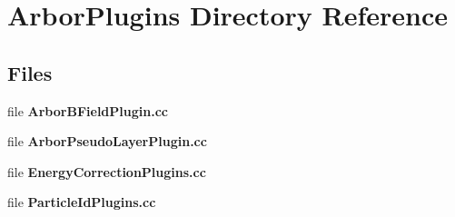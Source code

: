 \section{Arbor\+Plugins Directory Reference}
\label{dir_db9195e47b6b335ea11038eae6c53c57}
\subsection*{Files}
\begin{DoxyCompactItemize}
\item 
file {\bf Arbor\+B\+Field\+Plugin.\+cc}
\item 
file {\bf Arbor\+Pseudo\+Layer\+Plugin.\+cc}
\item 
file {\bf Energy\+Correction\+Plugins.\+cc}
\item 
file {\bf Particle\+Id\+Plugins.\+cc}
\end{DoxyCompactItemize}
